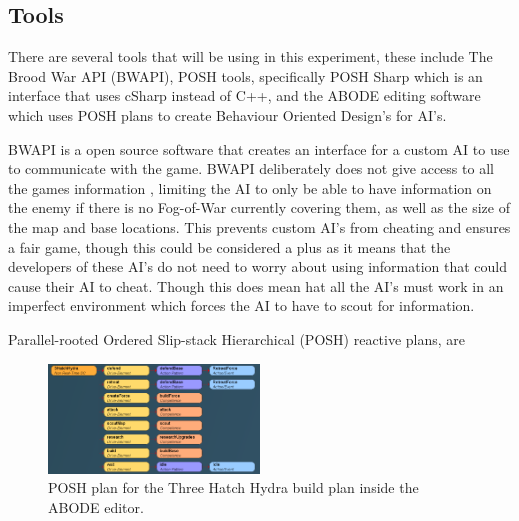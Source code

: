 \documentclass[journal]{IEEEtran}
\begin{document}
\subsection{Tools}
There are several tools that will be using in this experiment, these include The Brood War API (BWAPI), POSH tools, specifically POSH Sharp which is an interface that uses cSharp instead of C++, and the ABODE editing software which uses POSH plans to create Behaviour Oriented Design's for AI's. 

BWAPI \cite{BWAPI} is a open source software that creates an interface for a custom AI to use to communicate with the game. BWAPI deliberately does not give access to all the games information \cite{POSH}, limiting the AI to only be able to have information on the enemy if there is no Fog-of-War currently covering them, as well as the size of the map and base locations. This prevents custom AI's from cheating and ensures a fair game, though this could be considered a plus as it means that the developers of these AI's do not need to worry about using information that could cause their AI to cheat. Though this does mean hat all the AI's must work in an imperfect environment which forces the AI to have to scout for information.

Parallel-rooted Ordered Slip-stack Hierarchical (POSH) reactive plans, are 

\begin{figure}[h]
	\centering
	\includegraphics[width=0.5\textwidth]{POSH}
	\caption{POSH plan for the Three Hatch Hydra build plan inside the ABODE editor.}
	\label{fig:mesh1}
\end{figure}
\newpage







\end{document}

